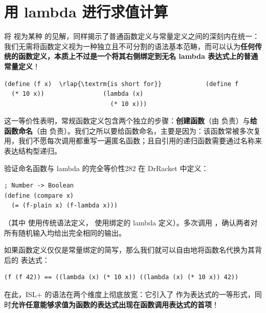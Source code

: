\section{用 lambda 进行求值计算}
\label{sec:17_2}

将  视为某种  的见解，同样揭示了普通函数定义与常量定义之间的深刻内在统一：我们无需将函数定义视为一种独立且不可分割的语法基本范畴，而可以认为\textbf{任何传统的函数定义，本质上不过是一个将其右侧绑定到无名 lambda 表达式上的普通常量定义}！

\begin{stepperbox}
\begin{Verbatim}[commandchars=\\\{\}, fontsize=\footnotesize]
(define (f x)  \rlap{\textrm{is short for}}            (define f
  (* 10 x))                (lambda (x)
                             (* 10 x)))
\end{Verbatim}
\end{stepperbox}

这一等价性表明，常规函数定义包含两个独立的步骤：\textbf{创建函数}（由  负责）与\textbf{给函数命名}（由  负责）。我们之所以要给函数命名，主要是因为：该函数常被多次复用，我们不愿每次调用都重写一遍匿名函数；且自引用的递归函数需要通过名称来表达结构型递归。

\begin{exercise}{验证命名函数与 lambda 的完全等价性}{282}
在 DrRacket 中定义：
\begin{lstlisting}[language=BSL]
; Number -> Boolean
(define (compare x)
  (= (f-plain x) (f-lambda x)))
\end{lstlisting}
（其中  使用传统语法定义， 使用绑定的 lambda 定义）。多次调用 ，确认两者对所有随机输入均给出完全相同的输出。
\end{exercise}

如果函数定义仅仅是常量绑定的简写，那么我们就可以自由地将函数名代换为其背后的  表达式：

\begin{lstlisting}[language=BSL]
(f (f 42)) == ((lambda (x) (* 10 x)) ((lambda (x) (* 10 x)) 42))
\end{lstlisting}

在此，ISL+ 的语法在两个维度上彻底放宽：它引入了  作为表达式的一等形式，同时\textbf{允许任意能够求值为函数的表达式出现在函数调用表达式的首项}！

